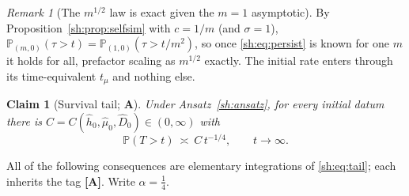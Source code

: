 \documentclass[11pt]{article}
\numberwithin{equation}{section}
\theoremstyle{plain}
\newtheorem{claim}[theorem]{Claim}
\theoremstyle{definition}
\theoremstyle{remark}
\newtheorem{remark}[theorem]{Remark}
\newcommand{\PP}{\mathbb{P}}
\begin{document}
\begin{remark}[The $m^{1/2}$ law is exact given the $m=1$ asymptotic]
By Proposition~\ref{sh:prop:selfsim} with $c=1/m$ (and $\sigma=1$),
$\PP_{(m,0)}(\tau>t)=\PP_{(1,0)}(\tau>t/m^2)$, so once
\eqref{sh:eq:persist} is known for one $m$ it holds for all, prefactor
scaling as $m^{1/2}$ exactly. The initial rate enters through its
time-equivalent $t_\mu$ and nothing else.
\end{remark}

\begin{claim}[Survival tail; \textbf{A}]\label{sh:claim:tail}
Under Ansatz~\ref{sh:ansatz}, for every initial datum there is
$C=C(\hat h_0,\hat\mu_0,\hat D_0)\in(0,\infty)$ with
\begin{equation}\label{sh:eq:tail}
\PP(T>t)\ \asymp\ C\,t^{-1/4},\qquad t\to\infty .
\end{equation}
\end{claim}

All of the following consequences are elementary integrations of
\eqref{sh:eq:tail}; each inherits the tag \textbf{[A]}. Write
$\alpha=\tfrac14$.
\end{document}
